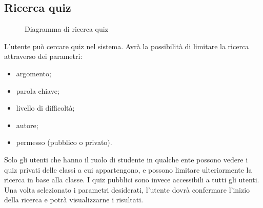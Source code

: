\documentclass[a4paper, titlepage]{article}
\begin{document}
\subsection{Ricerca quiz}
\begin{figure}[H]
	\centering
	\noindent{}
	\caption{Diagramma di ricerca quiz}
\end{figure}
L’utente può cercare quiz nel sistema. Avrà la possibilità di limitare la ricerca attraverso dei parametri: 
\begin{itemize}
	\item argomento;
	\item parola chiave; 
	\item livello di difficoltà; 
	\item autore;
	\item permesso (pubblico o privato). 
\end{itemize}
Solo gli utenti che hanno il ruolo di studente in qualche ente possono vedere i quiz privati delle classi a cui appartengono, e possono limitare ulteriormente la ricerca in base alla classe.
\newline I quiz pubblici sono invece accessibili a tutti gli utenti. Una volta selezionato i parametri desiderati, l’utente dovrà confermare l’inizio della ricerca e potrà visualizzarne i risultati. 
\end{document}
